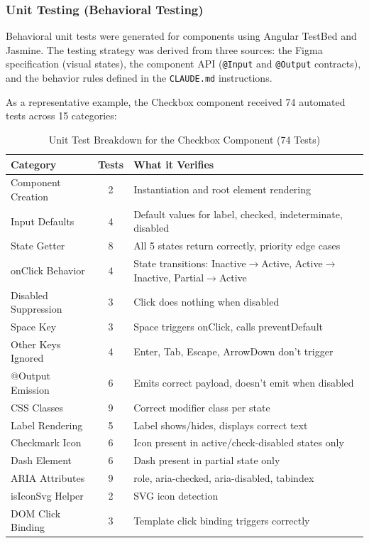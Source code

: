 \subsubsection{Unit Testing (Behavioral Testing)}

Behavioral unit tests were generated for components using Angular TestBed and Jasmine. The testing strategy was derived from three sources: the Figma specification (visual states), the component API (\texttt{@Input} and \texttt{@Output} contracts), and the behavior rules defined in the \texttt{CLAUDE.md} instructions.

As a representative example, the Checkbox component received 74 automated tests across 15 categories:

\begin{table}[H]
\centering
\caption{Unit Test Breakdown for the Checkbox Component (74 Tests)}
\label{tab:unit_tests}
\begin{tabular}{|l|c|p{7cm}|}
\hline
\textbf{Category} & \textbf{Tests} & \textbf{What it Verifies} \\ \hline
Component Creation & 2 & Instantiation and root element rendering \\ \hline
Input Defaults & 4 & Default values for label, checked, indeterminate, disabled \\ \hline
State Getter & 8 & All 5 states return correctly, priority edge cases \\ \hline
onClick Behavior & 4 & State transitions: Inactive$\rightarrow$Active, Active$\rightarrow$Inactive, Partial$\rightarrow$Active \\ \hline
Disabled Suppression & 3 & Click does nothing when disabled \\ \hline
Space Key & 3 & Space triggers onClick, calls preventDefault \\ \hline
Other Keys Ignored & 4 & Enter, Tab, Escape, ArrowDown don't trigger \\ \hline
@Output Emission & 6 & Emits correct payload, doesn't emit when disabled \\ \hline
CSS Classes & 9 & Correct modifier class per state \\ \hline
Label Rendering & 5 & Label shows/hides, displays correct text \\ \hline
Checkmark Icon & 6 & Icon present in active/check-disabled states only \\ \hline
Dash Element & 6 & Dash present in partial state only \\ \hline
ARIA Attributes & 9 & role, aria-checked, aria-disabled, tabindex \\ \hline
isIconSvg Helper & 2 & SVG icon detection \\ \hline
DOM Click Binding & 3 & Template click binding triggers correctly \\ \hline
\end{tabular}
\end{table}


